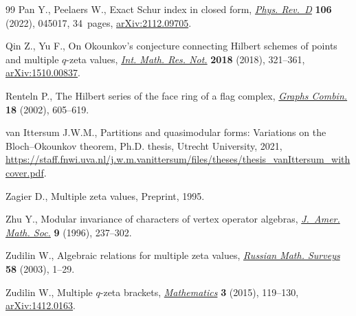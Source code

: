 \documentclass[pdftex]{sigma}
\numberwithin{equation}{section}
\theoremstyle{definition}
\begin{document}
\begin{thebibliography}{99}
Pan Y., Peelaers W., Exact {S}chur index in closed form,
 \href{https://doi.org/10.1103/physrevd.106.045017}{\textit{Phys. Rev.~D}}
 \textbf{106} (2022), 045017, 34~pages,
 \href{https://arxiv.org/abs/2112.09705}{arXiv:2112.09705}.

Qin Z., Yu F., On {O}kounkov's conjecture connecting {H}ilbert schemes of
 points and multiple {$q$}-zeta values,
 \href{https://doi.org/10.1093/imrn/rnw244}{\textit{Int. Math. Res. Not.}}
 \textbf{2018} (2018), 321--361,
 \href{https://arxiv.org/abs/1510.00837}{arXiv:1510.00837}.

Renteln P., The {H}ilbert series of the face ring of a flag complex,
 \href{https://doi.org/10.1007/s003730200045}{\textit{Graphs Combin.}}
 \textbf{18} (2002), 605--619.

van Ittersum J.W.M., Partitions and quasimodular forms: {V}ariations on the
 {B}loch--{O}kounkov theorem, Ph.D. thesis, {U}trecht {U}niversity, 2021,
 \url{https://staff.fnwi.uva.nl/j.w.m.vanittersum/files/theses/thesis_vanIttersum_withcover.pdf}.

Zagier D., Multiple zeta values, {P}reprint, 1995.

Zhu Y., Modular invariance of characters of vertex operator algebras,
 \href{https://doi.org/10.1090/S0894-0347-96-00182-8}{\textit{J.~Amer. Math.
 Soc.}} \textbf{9} (1996), 237--302.

Zudilin W., Algebraic relations for multiple zeta values,
 \href{https://doi.org/10.1070/RM2003v058n01ABEH000592}{\textit{Russian Math.
 Surveys}} \textbf{58} (2003), 1--29.

Zudilin W., Multiple $q$-zeta brackets,
 \href{https://doi.org/10.3390/math3010119}{\textit{Mathematics}} \textbf{3}
 (2015), 119--130, \href{https://arxiv.org/abs/1412.0163}{arXiv:1412.0163}.

\end{thebibliography}\LastPageEnding
\end{document}
